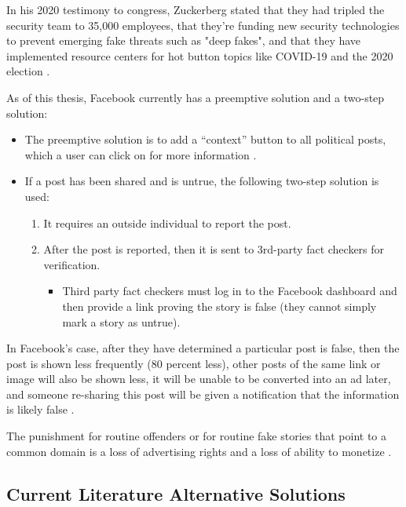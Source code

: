 \documentclass[preprint,review,12pt]{elsarticle}
\begin{document}
In his 2020 testimony to congress, Zuckerberg stated that they had tripled the security team to 35,000 employees, that they're funding new security technologies to prevent emerging fake threats such as "deep fakes", and that they have implemented resource centers for hot button topics like COVID-19 and the 2020 election \cite{zuckerberg2020}.


As of this thesis, Facebook currently has a preemptive solution and a two-step solution:
\renewcommand{\labelenumii}{\Roman{enumii}}
\begin{itemize}
\item The preemptive solution is to add a “context” button to all political posts, which a user can click on for more information \cite{smith2018designing}.
 \item If a post has been shared and is untrue, the following two-step solution is used:
 \begin{enumerate}
     \item It requires an outside individual to report the post. 
     \item After the post is reported, then it is  sent to 3rd-party fact checkers for verification. 
     \begin{itemize}
     \item Third party fact checkers must log in to the Facebook dashboard and then provide a link proving the story is false (they cannot simply mark a story as untrue).
     \end{itemize}
 \end{enumerate}
 \end{itemize}
 
 In Facebook’s case, after they have determined a particular post is false, then the post is shown less frequently (80 percent less), other posts of the same link or image will also be shown less, it will be unable to be converted into an ad later, and someone re-sharing this post will be given a notification that the information is likely false \cite{owen2016clamping,facebook2020fact}.
 
 The punishment for routine offenders or for routine fake stories that point to a common domain is a loss of advertising rights and a loss of ability to monetize \cite{facebook2020fact}.
 
 \subsection{Current Literature Alternative Solutions}
 
\end{document}
